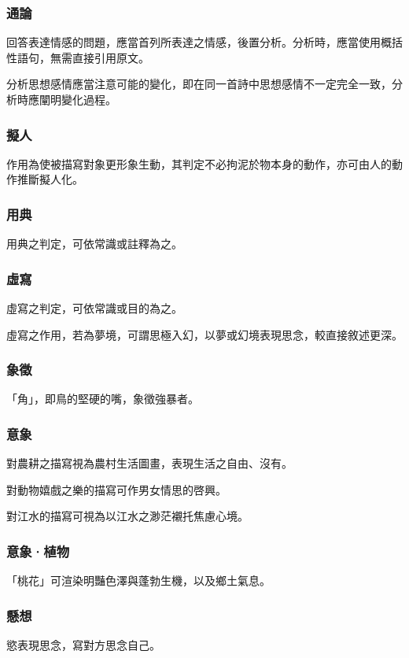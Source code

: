 \documentclass{ctexart}
\begin{document}
\subsubsection*{通論}
回答表達情感的問題，應當首列所表達之情感，後置分析。分析時，應當使用概括性語句，無需直接引用原文。
\par
分析思想感情應當注意可能的變化，即在同一首詩中思想感情不一定完全一致，分析時應闡明變化過程。
\subsubsection*{擬人}
作用為使被描寫對象更形象生動，其判定不必拘泥於物本身的動作，亦可由人的動作推斷擬人化。
\subsubsection*{用典}
用典之判定，可依常識或註釋為之。
\subsubsection*{虛寫}
虛寫之判定，可依常識或目的為之。
\par
虛寫之作用，若為夢境，可謂思極入幻，以夢或幻境表現思念，較直接敘述更深。
\subsubsection*{象徵}
「角」，即鳥的堅硬的嘴，象徵強暴者。
\subsubsection*{意象}
對農耕之描寫視為農村生活圖畫，表現生活之自由、沒有。
\par
對動物嬉戲之樂的描寫可作男女情思的啓興。
\par
對江水的描寫可視為以江水之渺茫襯托焦慮心境。
\subsubsection*{意象·植物}
「桃花」可渲染明豔色澤與蓬勃生機，以及鄉土氣息。
\subsubsection*{懸想}
慾表現思念，寫對方思念自己。
\end{document}
